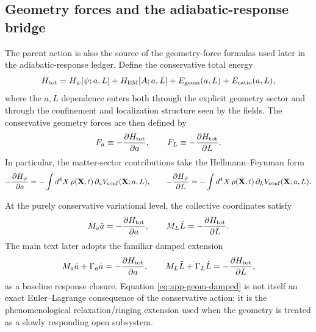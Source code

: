 \documentclass[11pt]{article}
\begin{document}
\subsection{Geometry forces and the adiabatic-response bridge}
\label{app:variational-geometry}

The parent action is also the source of the geometry-force formulas used later in the
adiabatic-response ledger. Define the conservative total energy
\begin{equation}
H_{\rm tot}
=
H_\psi[\psi;a,L]
+
H_{\rm EM}[A;a,L]
+
E_{\rm geom}(a,L)
+
E_{\rm ratio}(a,L),
\label{eq:app-Htot}
\end{equation}
where the \(a,L\) dependence enters both through the explicit geometry sector and through
the confinement and localization structure seen by the fields. The conservative geometry
forces are then defined by
\begin{equation}
F_a \equiv -\frac{\partial H_{\rm tot}}{\partial a},
\qquad
F_L \equiv -\frac{\partial H_{\rm tot}}{\partial L}.
\label{eq:app-FaFL}
\end{equation}
In particular, the matter-sector contributions take the Hellmann--Feynman form
\begin{equation}
-\frac{\partial H_\psi}{\partial a}
=
-\int d^4X\, \rho(\mathbf X,t)\,\partial_a V_{\rm conf}(\mathbf X;a,L),
\qquad
-\frac{\partial H_\psi}{\partial L}
=
-\int d^4X\, \rho(\mathbf X,t)\,\partial_L V_{\rm conf}(\mathbf X;a,L).
\label{eq:app-HF-matter}
\end{equation}

At the purely conservative variational level, the collective coordinates satisfy
\begin{equation}
M_a \ddot a = -\frac{\partial H_{\rm tot}}{\partial a},
\qquad
M_L \ddot L = -\frac{\partial H_{\rm tot}}{\partial L}.
\label{eq:app-geom-conservative}
\end{equation}
The main text later adopts the familiar damped extension
\begin{equation}
M_a \ddot a + \Gamma_a \dot a = -\frac{\partial H_{\rm tot}}{\partial a},
\qquad
M_L \ddot L + \Gamma_L \dot L = -\frac{\partial H_{\rm tot}}{\partial L},
\label{eq:app-geom-damped}
\end{equation}
as a baseline response closure. Equation \eqref{eq:app-geom-damped} is not itself an
exact Euler--Lagrange consequence of the conservative action; it is the phenomenological
relaxation/ringing extension used when the geometry is treated as a slowly responding open
subsystem.
\end{document}

